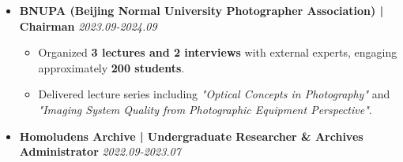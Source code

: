 \documentclass[10pt, a4paper]{article}
\begin{document}
\begin{itemize}[leftmargin=*, label={}]

    \item
    \textbf{BNUPA (Beijing Normal University Photographer Association) | Chairman} \hfill \textit{2023.09-2024.09}
    \begin{itemize}[leftmargin=1.5em]
        \item Organized \textbf{3 lectures and 2 interviews} with external experts, engaging approximately \textbf{200 students}.
        \item Delivered lecture series including \textit{"Optical Concepts in Photography"} and \textit{"Imaging System Quality from Photographic Equipment Perspective"}.
    \end{itemize}
    \vspace{0.2em}
    
    \item
    \textbf{Homoludens Archive | Undergraduate Researcher \& Archives Administrator} \hfill \textit{2022.09-2023.07}

\end{itemize}

\end{document}
